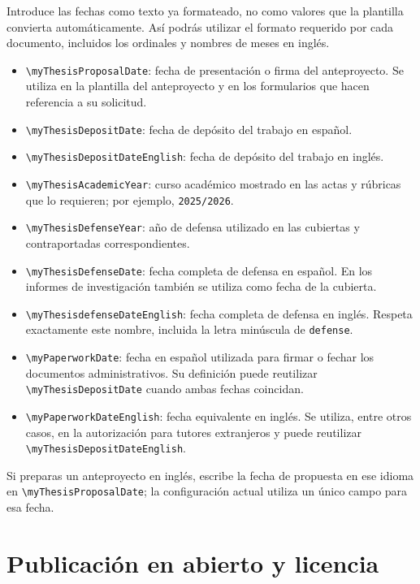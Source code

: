 Introduce las fechas como texto ya formateado, no como valores que la plantilla convierta automáticamente. Así podrás utilizar el formato requerido por cada documento, incluidos los ordinales y nombres de meses en inglés.

\begin{itemize}
  \item \texttt{\textbackslash{}myThesisProposalDate}: fecha de presentación o firma del anteproyecto. Se utiliza en la plantilla del anteproyecto y en los formularios que hacen referencia a su solicitud.
  \item \texttt{\textbackslash{}myThesisDepositDate}: fecha de depósito del trabajo en español.
  \item \texttt{\textbackslash{}myThesisDepositDateEnglish}: fecha de depósito del trabajo en inglés.
  \item \texttt{\textbackslash{}myThesisAcademicYear}: curso académico mostrado en las actas y rúbricas que lo requieren; por ejemplo, \texttt{2025/2026}.
  \item \texttt{\textbackslash{}myThesisDefenseYear}: año de defensa utilizado en las cubiertas y contraportadas correspondientes.
  \item \texttt{\textbackslash{}myThesisDefenseDate}: fecha completa de defensa en español. En los informes de investigación también se utiliza como fecha de la cubierta.
  \item \texttt{\textbackslash{}myThesisdefenseDateEnglish}: fecha completa de defensa en inglés. Respeta exactamente este nombre, incluida la letra minúscula de \texttt{defense}.
  \item \texttt{\textbackslash{}myPaperworkDate}: fecha en español utilizada para firmar o fechar los documentos administrativos. Su definición puede reutilizar \texttt{\textbackslash{}myThesisDepositDate} cuando ambas fechas coincidan.
  \item \texttt{\textbackslash{}myPaperworkDateEnglish}: fecha equivalente en inglés. Se utiliza, entre otros casos, en la autorización para tutores extranjeros y puede reutilizar \texttt{\textbackslash{}myThesisDepositDateEnglish}.
\end{itemize}

Si preparas un anteproyecto en inglés, escribe la fecha de propuesta en ese idioma en \texttt{\textbackslash{}myThesisProposalDate}; la configuración actual utiliza un único campo para esa fecha.

\section{Publicación en abierto y licencia}

